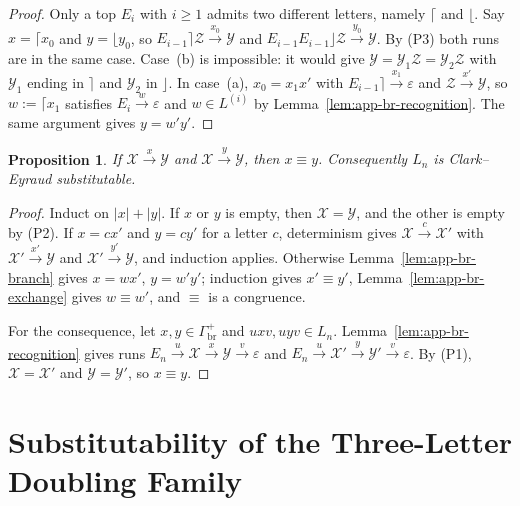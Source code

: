 \documentclass[11pt]{article}
\numberwithin{equation}{section}
\theoremstyle{plain}
\newtheorem{proposition}[theorem]{Proposition}
\theoremstyle{definition}
\theoremstyle{remark}
\newcommand{\eps}{\varepsilon}
\begin{document}
\begin{proof}
Only a top $E_i$ with $i\ge1$ admits two different letters, namely
$\lceil$ and $\lfloor$. Say $x=\lceil x_0$ and $y=\lfloor y_0$, so
$E_{i-1}\rceil\mathcal Z\xrightarrow{x_0}\mathcal Y$ and
$E_{i-1}E_{i-1}\rfloor\mathcal Z\xrightarrow{y_0}\mathcal Y$. By (P3) both runs
are in the same case. Case~(b) is impossible: it would give
$\mathcal Y=\mathcal Y_1\mathcal Z=\mathcal Y_2\mathcal Z$ with $\mathcal Y_1$ ending in $\rceil$ and
$\mathcal Y_2$ in $\rfloor$. In case~(a), $x_0=x_1x'$ with
$E_{i-1}\rceil\xrightarrow{x_1}\eps$ and $\mathcal Z\xrightarrow{x'}\mathcal Y$, so
$w:=\lceil x_1$ satisfies $E_i\xrightarrow{w}\eps$ and $w\in L^{(i)}$ by
Lemma~\ref{lem:app-br-recognition}. The same argument gives $y=w'y'$.
\end{proof}

\begin{proposition}\label{prop:app-br-congruence}
If $\mathcal X\xrightarrow{x}\mathcal Y$ and $\mathcal X\xrightarrow{y}\mathcal Y$, then
$x\equiv y$. Consequently $L_n$ is Clark--Eyraud substitutable.
\end{proposition}

\begin{proof}
Induct on $|x|+|y|$. If $x$ or $y$ is empty, then $\mathcal X=\mathcal Y$, and the
other is empty by (P2). If $x=cx'$ and $y=cy'$ for a letter $c$,
determinism gives $\mathcal X\xrightarrow{c}\mathcal X'$ with
$\mathcal X'\xrightarrow{x'}\mathcal Y$ and $\mathcal X'\xrightarrow{y'}\mathcal Y$, and
induction applies. Otherwise Lemma~\ref{lem:app-br-branch} gives
$x=wx'$, $y=w'y'$; induction gives $x'\equiv y'$,
Lemma~\ref{lem:app-br-exchange} gives $w\equiv w'$, and $\equiv$ is a
congruence.

For the consequence, let $x,y\in\Gamma_{\mathrm{br}}^+$ and
$uxv,uyv\in L_n$. Lemma~\ref{lem:app-br-recognition} gives runs
$E_n\xrightarrow{u}\mathcal X\xrightarrow{x}\mathcal Y\xrightarrow{v}\eps$ and
$E_n\xrightarrow{u}\mathcal X'\xrightarrow{y}\mathcal Y'\xrightarrow{v}\eps$. By
(P1), $\mathcal X=\mathcal X'$ and $\mathcal Y=\mathcal Y'$, so $x\equiv y$.
\end{proof}

\section{Substitutability of the Three-Letter Doubling Family}
\label{app:three-letter-family}
\end{document}
